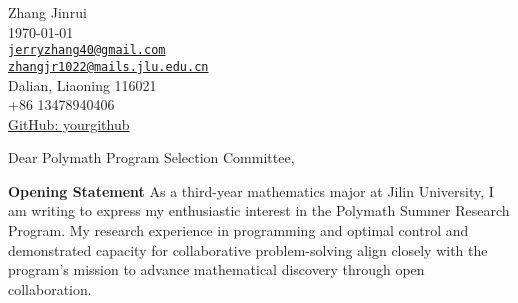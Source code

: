 \documentclass[11pt]{article}
\begin{document}
\begin{flushright}
    Zhang Jinrui \\
    \today \\  %
    \href{mailto:jerryzhang40@gmail.com}{\texttt{jerryzhang40@gmail.com}}\\
    \href{mailto:zhangjr1022@mails.jlu.edu.cn}{\texttt{zhangjr1022@mails.jlu.edu.cn}}\\
    Dalian, Liaoning 116021 \\
    +86 13478940406 \\
    \href{https://github.com/yourgithub}{GitHub: yourgithub}
\end{flushright}

\vspace{0.2cm}  %

\vspace{0.5cm}


\vspace{1cm}

Dear Polymath Program Selection Committee,

\par\textbf{Opening Statement}
As a third-year mathematics major at Jilin University, I am writing to express my enthusiastic interest in the Polymath Summer Research Program. My research experience in programming and optimal control and demonstrated capacity for collaborative problem-solving align closely with the program's mission to advance mathematical discovery through open collaboration.

\end{document}
